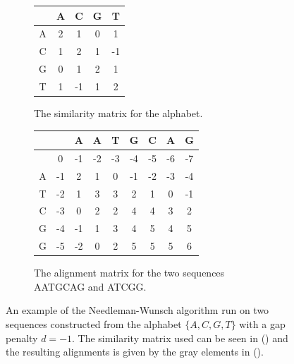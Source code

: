 \documentclass[a4paper]{report}
\begin{document}
\begin{figure}[t]
    \centering
    \begin{subfigure}[b]{0.3\textwidth}
        \begin{tabular}{| c | c | c | c | c |}
            \hline
              &  A &  C & G &  T \\ \hline
            A &  2 &  1 & 0 &  1 \\ \hline
            C &  1 &  2 & 1 & -1 \\ \hline
            G &  0 &  1 & 2 &  1 \\ \hline
            T &  1 & -1 & 1 &  2 \\ \hline
        \end{tabular}
        \caption{The similarity matrix for the alphabet.}
        \label{fig:simmatrix}
    \end{subfigure}
    \quad
    \begin{subfigure}[b]{0.55\textwidth}
        \begin{tabular}{| c | c | c | c | c | c | c | c | c |}
            \hline
            & & A & A & T & G & C & A & G \\ \hline
            &\cellcolor[gray]{0.9}0 &\cellcolor[gray]{0.9}-1 & -2 & -3 & -4 &
            -5 & -6 & -7 \\ \hline
            A & -1 & 2 &\cellcolor[gray]{0.9}1 & 0 & -1 & -2 & -3 & -4 \\
            \hline
            T & -2 & 1 & 3 &\cellcolor[gray]{0.9}3 &\cellcolor[gray]{0.9}2 & 1
            & 0 & -1 \\ \hline
            C & -3 & 0 & 2 & 2 & 4 &\cellcolor[gray]{0.9}4 & 3 & 2 \\ \hline
            G & -4 & -1 & 1 & 3 & 4 & 5 &\cellcolor[gray]{0.9}4 & 5 \\ \hline
            G & -5 & -2 & 0 & 2 & 5 & 5 & 5 &\cellcolor[gray]{0.9}6 \\ \hline
        \end{tabular}
        \caption{The alignment matrix for the two sequences AATGCAG and
        ATCGG.}
        \label{fig:nwmatrix}
    \end{subfigure}
    \caption{An example of the Needleman-Wunsch algorithm run on two sequences
    constructed from the alphabet $\{A, C, G, T\}$ with a gap penalty $d = -1$.
    The similarity matrix used can be seen in () and the
    resulting alignments is given by the gray elements in
    ().}
    \label{fig:nwtables}
\end{figure}
\end{document}
